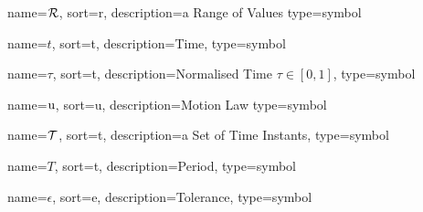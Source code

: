 	{%
		name={\ensuremath{\set{R}}},
		sort=r,
		description=a Range of Values
		type=symbol
	}
	\newcommand{\setofranges}{\gls{sym:setofranges}}
	\newcommand{\setofrangestimenorm}{\ensuremath{\setofranges_{\timenorm}}}


	{%
		name={\ensuremath{t}},
		sort=t,
		description=Time,
		type=symbol
	}
	\newcommand{\timesym}{\gls{sym:time}}

	{%
		name={\ensuremath{\tau}},
		sort=t,
		description=Normalised Time \ensuremath{\tau \in [0, 1]},
		type=symbol
	}
	\newcommand{\timenorm}{\gls{sym:timenorm}}

	{%
		name={\ensuremath{\func{u}}},
		sort=u,
		description=Motion Law
		type=symbol
	}
	\newcommand{\motionlaw}{\gls{sym:motionlaw}}

	{%
		name={\ensuremath{\set{T}}},
		sort=t,
		description=a Set of Time Instants,
		type=symbol
	}
	\newcommand{\setoftimeinstants}{\gls{sym:setoftimeinstants}}

	{%
		name={\ensuremath{T}},
		sort=t,
		description=Period,
		type=symbol
	}
	\newcommand{\period}{\gls{sym:period}}

	{%
		name={\ensuremath{\epsilon}},
		sort=e,
		description=Tolerance,
		type=symbol
	}
	\newcommand{\tol}{\gls{sym:tolerance}}

